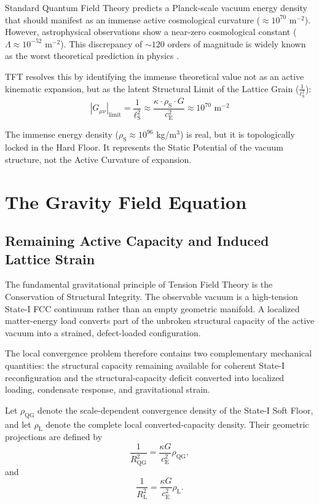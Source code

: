 Standard Quantum Field Theory predicts a Planck-scale vacuum energy density that should manifest as an immense active cosmological curvature ($\approx 10^{70}\text{ m}^{-2}$). However, astrophysical observations show a near-zero cosmological constant ($\Lambda \approx 10^{-52}\text{ m}^{-2}$). This discrepancy of $\sim 120$ orders of magnitude is widely known as the worst theoretical prediction in physics \cite{Weinberg_1989}.

TFT resolves this by identifying the immense theoretical value not as an active kinematic expansion, but as the latent Structural Limit of the Lattice Grain ($\frac{1}{\ell_{\mathrm{S}}^2}$):
\begin{equation}
    |G_{\mu\nu}|_{\mathrm{limit}} = \frac{1}{\ell_{\mathrm{S}}^2} \approx \frac{\kappa \cdot \rho_{\mathrm{S}} \cdot G}{c_{\mathrm{E}}^2} \approx 10^{70} \text{ m}^{-2}
\end{equation}

The immense energy density ($\rho_{\mathrm{S}} \approx 10^{96}$ kg/m$^3$) is real, but it is topologically locked in the Hard Floor. It represents the Static Potential of the vacuum structure, not the Active Curvature of expansion.

\section{The Gravity Field Equation}

\subsection{Remaining Active Capacity and Induced Lattice Strain}

The fundamental gravitational principle of Tension Field Theory is the Conservation of Structural Integrity. The observable vacuum is a high-tension State-I FCC continuum rather than an empty geometric manifold. A localized matter-energy load converts part of the unbroken structural capacity of the active vacuum into a strained, defect-loaded configuration.

The local convergence problem therefore contains two complementary mechanical quantities: the structural capacity remaining available for coherent State-I reconfiguration and the structural-capacity deficit converted into localized loading, condensate response, and gravitational strain.

Let $\rho_{\mathrm{QG}}$ denote the scale-dependent convergence density of the State-I Soft Floor, and let $\rho_{\mathrm{L}}$ denote the complete local converted-capacity density. Their geometric projections are defined by
\begin{equation}
    \frac{1}{R_{\mathrm{QG}}^2} = \frac{\kappa G}{c_{\mathrm{E}}^2} \rho_{\mathrm{QG}},
\end{equation}
and
\begin{equation}
    \frac{1}{R_{\mathrm{L}}^2} = \frac{\kappa G}{c_{\mathrm{E}}^2} \rho_{\mathrm{L}}.
\end{equation}

